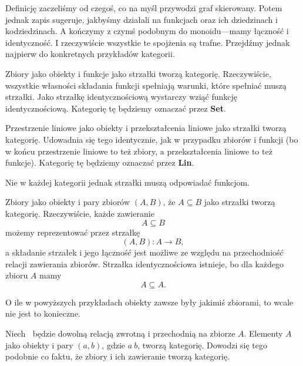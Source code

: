 Definicję zaczeliśmy od czegoś,
co na myśl przywodzi graf skierowany.
Potem jednak zapis sugeruje,
jakbyśmy działali na funkcjach oraz ich dziedzinach i kodziedzinach.
A kończymy z czymś podobnym do monoidu---mamy łączność i identyczność.
I rzeczywiście wszystkie te spojżenia są trafne.
Przejdźmy jednak najpierw do konkretnych przykładów kategorii.

\begin{example}
	Zbiory jako obiekty i funkcje jako strzałki tworzą kategorię.
	Rzeczywiście,
	wszystkie własności składania funkcji spełniają warunki,
	które spełniać muszą strzałki.
	Jako strzałkę identycznościową wystarczy wziąć funkcję identycznościową.
	Kategorię tę będziemy oznaczać przez \textbf{Set}.
\end{example}

\begin{example}
	Przestrzenie liniowe jako obiekty i przekształcenia liniowe jako strzałki tworzą kategorię.
	Udowadnia się tego identycznie, jak w przypadku zbiorów i funkcji
	(bo w końcu przestrzenie liniowe to też zbiory, a przekształcenia liniowe to też funkcje).
	Kategorię tę będziemy oznaczać przez \textbf{Lin}.
\end{example}

Nie w każdej kategorii jednak strzałki muszą odpowiadać funkcjom.

\begin{example}
	Zbiory jako obiekty i pary zbiorów $(A, B)$, że $A \subseteq B$ jako strzałki tworzą kategorię.
	Rzeczywiście,
	każde zawieranie
	\begin{equation}
		A \subseteq B
	\end{equation}
	możemy reprezentować przez strzałkę
	\begin{equation}
		(A, B): A \to B,
	\end{equation}
	a składanie strzałek i jego łączność jest możliwe
	ze względu na przechodniość relacji zawierania zbiorów.
	Strzałka identycznościowa istnieje,
	bo dla każdego zbioru $A$ mamy
	\begin{equation}
		A \subseteq A.
	\end{equation}
\end{example}

O ile w powyższych przykładach obiekty zawsze były jakimiś zbiorami,
to wcale nie jest to konieczne.

\begin{example}
	Niech $~$ będzie dowolną relacją zwrotną i przechodnią na zbiorze $A$.
	Elementy $A$ jako obiekty i pary $(a, b)$, gdzie $a ~ b$,
	tworzą kategorię.
	Dowodzi się tego podobnie co faktu,
	że zbiory i ich zawieranie tworzą kategorię.
\end{example}

